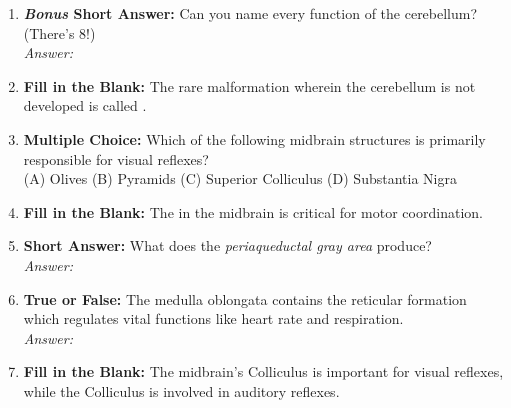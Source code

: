 \begin{enumerate}[label=\textbf{Q1.9.\arabic*}]
      \item \textbf{\textit{Bonus} Short Answer:} Can you name every function of the cerebellum? (There's 8!) \\
            \textit{Answer:} \\[0.5em]%

      \item \textbf{Fill in the Blank:} The rare malformation wherein the cerebellum is not developed is called \underline{\hspace{3cm}}. \\

      \item \textbf{Multiple Choice:} Which of the following midbrain structures is primarily responsible for visual reflexes? \\
            (A) Olives \quad (B) Pyramids \quad (C) Superior Colliculus \quad (D) Substantia Nigra \\

      \item \textbf{Fill in the Blank:} The \underline{\hspace{3cm}} in the midbrain is critical for motor coordination. \\

      \item \textbf{Short Answer:} What does the \textit{periaqueductal gray area} produce? \\
            \textit{Answer:} \\%

      \item \textbf{True or False:} The medulla oblongata contains the reticular formation which regulates vital functions like heart rate and respiration. \\
            \textit{Answer:} %

      \item \textbf{Fill in the Blank:} The midbrain’s \underline{\hspace{3cm}} Colliculus is important for visual reflexes, while the \underline{\hspace{3cm}} Colliculus is involved in auditory reflexes.


\end{enumerate}
